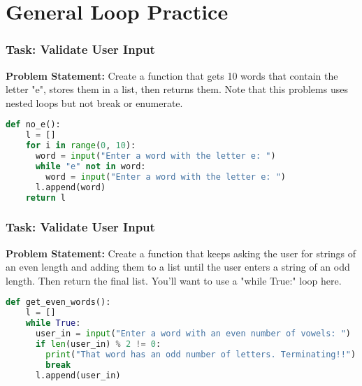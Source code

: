 \documentclass{beamer}
\begin{document}
\section{General Loop Practice}

%
%
\begin{frame}[fragile]
  \frametitle{Task: Validate User Input}
  \textbf{Problem Statement:} Create a function that gets 10 words that contain the letter "e", stores them in a list, then returns them. Note that this problems uses nested loops but not break or enumerate.
  \vfill
  \pause
  \begin{lstlisting}[language=Python, autogobble, basicstyle=\tiny]
  def no_e():
    l = []
    for i in range(0, 10):
      word = input("Enter a word with the letter e: ")
      while "e" not in word:
        word = input("Enter a word with the letter e: ")
      l.append(word)
    return l
  \end{lstlisting}
\end{frame}

%
%
\begin{frame}[fragile]
  \frametitle{Task: Validate User Input}
  \textbf{Problem Statement:} Create a function that keeps asking the user for strings of an even length and adding them to a list until the user enters a string of an odd length. Then return the final list. You'll want to use a "while True:" loop here.
  \vfill
  \pause
  \begin{lstlisting}[language=Python, autogobble, basicstyle=\tiny]
  def get_even_words():
    l = []
    while True:
      user_in = input("Enter a word with an even number of vowels: ")
      if len(user_in) % 2 != 0:
        print("That word has an odd number of letters. Terminating!!")
        break
      l.append(user_in)
  \end{lstlisting}
\end{frame}
\end{document}
